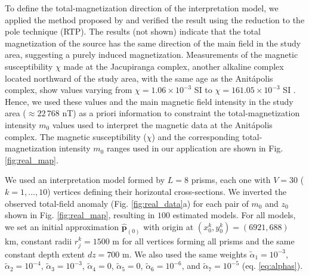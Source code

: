 To define the total-magnetization direction of the interpretation model, 
we applied the method proposed by \citet{oliveirajr-etal2015} and verified the 
result using the reduction to the pole technique (RTP). The results (not shown) 
indicate that the total magnetization of the source has the same direction of the 
main field in the study area, suggesting a purely induced magnetization.
Measurements of the magnetic susceptibility $\chi$ made at the Jacupiranga complex,
another alkaline complex located northward of the study area, 
with the same age as the Anit{\'a}polis complex, 
show values varying from $\chi = 1.06 \times 10^{-3}$ SI to 
$\chi = 161.05 \times 10^{-3}$ SI \citep[][ tb. 1]{valdivia-2009}.
Hence, we used these values and the main magnetic field intensity in the study area 
($\approx 22 \, 768 $ nT) as a priori information to constraint the 
total-magnetization intensity $m_{0}$ values used to interpret the magnetic data 
at the Anit{\'a}polis complex.
The magnetic susceptibility ($ \chi $) and the corresponding total-magnetization 
intensity $m_{0}$ ranges used in our application are shown in Fig. \ref{fig:real_map}.

We used an interpretation model formed by $L = 8$ prisms, each one with 
$V = 30$ ($k = 1, \dots , 10$) vertices defining their horizontal cross-sections.
We inverted the observed total-field anomaly (Fig. \ref{fig:real_data}a) for each 
pair of $m_0$ and $z_0$ shown in Fig. \ref{fig:real_map}, resulting in $100$ estimated 
models. 
For all models, we set an initial approximation $\hat{\mathbf{p}}_{(0)}$ with origin 
at $(x_0^k, y_0^k) = (6921, 688)$ km, constant radii $r_j^k = 1500$ m for 
all vertices forming all prisms and the same constant depth extent $dz = 700$ m.
We also used the same weights $\tilde{\alpha}_1 = 10^{-3}$, 
$\tilde{\alpha}_2 = 10^{-4}$, 
$\tilde{\alpha}_3 = 10^{-3}$, $\tilde{\alpha}_4 = 0$, $\tilde{\alpha}_5 = 0$, 
$\tilde{\alpha}_6 = 10^{-6}$, and $\tilde{\alpha}_7 = 10^{-5}$ (eq. \ref{eq:alphas}). 

